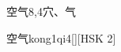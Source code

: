 \begin{entry}{空气}{8,4}{⽳、⽓}
  \begin{phonetics}{空气}{kong1qi4}[][HSK 2]
  \end{phonetics}
\end{entry}
